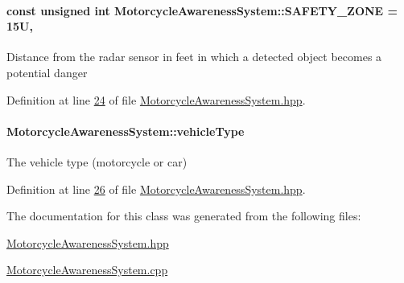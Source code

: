 \hypertarget{classMotorcycleAwarenessSystem_a131c99d85b78020f94fe14bd397f3a6e}{
\paragraph[{S\-A\-F\-E\-T\-Y\-\_\-\-Z\-O\-N\-E}]{\setlength{\rightskip}{0pt plus 5cm}const unsigned int Motorcycle\-Awareness\-System\-::\-S\-A\-F\-E\-T\-Y\-\_\-\-Z\-O\-N\-E = 15\-U\hspace{0.3cm}{\ttfamily [static]}, {\ttfamily [private]}}}\label{classMotorcycleAwarenessSystem_a131c99d85b78020f94fe14bd397f3a6e}
Distance from the radar sensor in feet in which a detected object becomes a potential danger 

Definition at line \hyperlink{MotorcycleAwarenessSystem_8hpp_source_l00024}{24} of file \hyperlink{MotorcycleAwarenessSystem_8hpp_source}{Motorcycle\-Awareness\-System.\-hpp}.

\hypertarget{classMotorcycleAwarenessSystem_a977b2085bfbf6a62902bf2d80160e6d2}{
\paragraph[{vehicle\-Type}]{ Motorcycle\-Awareness\-System\-::vehicle\-Type\hspace{0.3cm}{\ttfamily [private]}}}\label{classMotorcycleAwarenessSystem_a977b2085bfbf6a62902bf2d80160e6d2}


The vehicle type (motorcycle or car) 



Definition at line \hyperlink{MotorcycleAwarenessSystem_8hpp_source_l00026}{26} of file \hyperlink{MotorcycleAwarenessSystem_8hpp_source}{Motorcycle\-Awareness\-System.\-hpp}.



The documentation for this class was generated from the following files\-:\begin{DoxyCompactItemize}
\item 
\hyperlink{MotorcycleAwarenessSystem_8hpp}{Motorcycle\-Awareness\-System.\-hpp}\item 
\hyperlink{MotorcycleAwarenessSystem_8cpp}{Motorcycle\-Awareness\-System.\-cpp}\end{DoxyCompactItemize}
